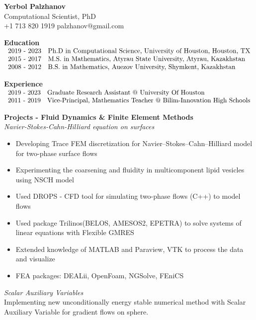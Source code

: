 \documentclass[10pt,letterpaper]{letter}
\begin{document}
	\begin{center}
\textbf{	Yerbol Palzhanov}\\ Computational Scientist, PhD\\
+1 713 820 1919 \quad palzhanov@gmail.com
	\end{center}
\textbf{Education}\\
$\begin{array}{r l }
\text{2019 - 2023} & \text{Ph.D in Computational Science, University of Houston, Houston, TX} \\
\text{2015 - 2017} & \text{M.S. in Mathematics, Atyrau State University, Atyrau, Kazakhstan}\\
 \text{2008 - 2012} & \text{B.S. in Mathematics, Auezov University, Shymkent, Kazakhstan}
\end{array}$


\textbf{Experience}\\
$\begin{array}{r l }
\text{2019 - 2023} & \text{Graduate Research Assistant @ University Of Houston} \\
\text{2011 - 2019} & \text{Vice-Principal, Mathematics Teacher @ Bilim-Innovation High Schools} 
\end{array}$



\textbf{Projects - Fluid Dynamics \& Finite Element Methods}\\
\textit{Navier-Stokes-Cahn-Hilliard equation on surfaces}
\begin{itemize}
	\item {Developing Trace FEM discretization for Navier–Stokes–Cahn–Hilliard model
		for two-phase surface flows}
	\item {Experimenting the coarsening and fluidity in multicomponent lipid vesicles using NSCH model}
	\item {Used DROPS - CFD tool for simulating two-phase flows (C++) to model flows}
	\item {Used package Trilinos(BELOS, AMESOS2, EPETRA) to solve systems of linear equations with Flexible GMRES}
	\item {Extended knowledge of MATLAB and Paraview, VTK to process the data and visualize }
	\item {FEA packages: DEALii, OpenFoam, NGSolve, FEniCS}
\end{itemize}
\textit{Scalar Auxiliary Variables}\\
\hspace*{10mm} Implementing new unconditionally energy stable numerical method with Scalar Auxiliary Variable 
for gradient flows 
\hspace*{10mm} on sphere.
\end{document}
